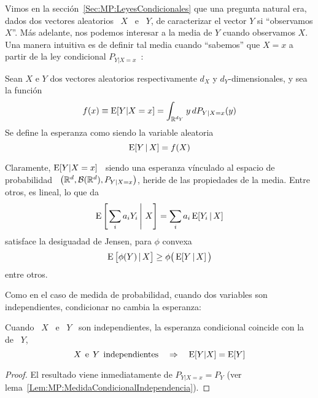 \label{Sec:MP:EsperanzaCondicional}

Vimos en  la secci\'on~\ref{Sec:MP:LeyesCondicionales} que  una pregunta natural
era, dados dos  vectores aleatorios \ $X$  \ e \ $Y$, de  caracterizar el vector
$Y$ si ``observamos $X$''.  M\'as adelante,  nos podemos interesar a la media de
$Y$ cuando observamos  $X$. Una manera intuitiva es de  definir tal media cuando
``sabemos'' que  $X=x$ a partir  de la ley  condicional $P_{Y|X=x}$~\cite{Fel68,
  Fel71, AshDol99, AthLah06, Spi76, Kol56, JacPro03, Bil12}:

\begin{definicion}
  Sean   $X$   e  $Y$   dos   vectores   aleatorios   respectivamente  $d_X$   y
  $d_Y$-dimensionales, y sea la funci\'on
  \[
  f(x) \equiv \operatorname{E}[Y | X=x ] = \int_{\mathbb{R}^{d_Y}} y \, dP_{Y|X=x}(y)
  \]
  Se define la esperanza  como siendo la
  variable aleatoria
  \[
  \operatorname{E}[Y \, | \, X] = f(X)
  \]
\end{definicion}

Claramente, $\operatorname{E}[Y  | X=x]$  \ siendo una  esperanza v\'inculado al  espacio de
probabilidad \ $\left( \mathbb{R}^d , \mathcal{B}(\mathbb{R}^d) , P_{Y|X=x} \right)$, heride de las
propiedades de la media. Entre otros, es lineal, lo que da
%
\[
\operatorname{E}\left[ \left. \sum_i  a_i Y_i \, \right| \, X \right]  = \sum_i a_i \operatorname{E}[Y_i
\, | \, X]
\]
%
satisface la desiguadad de Jensen, para $\phi$ convexa
%
\[
\operatorname{E}\big[ \phi(Y) \, | \, X \big] \ge \phi\big( \operatorname{E}[Y \, | \, X] \, \big)
\]
%
entre otros.

Como  en  el   caso  de  medida  de  probabilidad,   cuando  dos  variables  son
independientes, condicionar no cambia la esperanza:
%
\begin{lema}
\label{Lem:MP:EperanzaondicionalIndependencia}
%
  Cuando \ $X$ \ e \ $Y$ \ son independientes, la esperanza condicional coincide
  con la de \ $Y$,
  \[
  X  \:\: \mbox{e}  \:\: Y  \:\: \mbox{independientes}  \quad  \Rightarrow \quad
  \operatorname{E}[Y|X] = \operatorname{E}[Y]
  \]
\end{lema}
\begin{proof}
  El   resultado    viene   inmediatamente    de   $P_{Y|X=x}   =    P_Y$   (ver
  lema~\ref{Lem:MP:MedidaCondicionalIndependencia}).
\end{proof}

